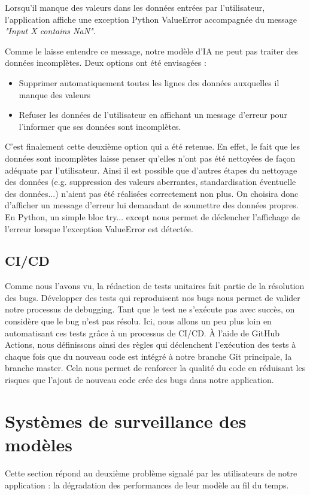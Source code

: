 \documentclass[french]{article}
\begin{document}
    Lorsqu'il manque des valeurs dans les données entrées par l'utilisateur, l'application affiche une exception Python ValueError accompagnée du message \textit{"Input X contains NaN"}.

    Comme le laisse entendre ce message, notre modèle d'IA ne peut pas traiter des données incomplètes. Deux options ont été envisagées :
    \begin{itemize}
        \item Supprimer automatiquement toutes les lignes des données auxquelles il manque des valeurs
        \item Refuser les données de l'utilisateur en affichant un message d'erreur pour l'informer que ses données sont incomplètes.
    \end{itemize}
    C'est finalement cette deuxième option qui a été retenue. En effet, le fait que les données sont incomplètes laisse penser qu'elles n'ont pas été nettoyées de façon adéquate par l'utilisateur. Ainsi il est possible que d'autres étapes du nettoyage des données (e.g. suppression des valeurs aberrantes, standardisation éventuelle des données...) n'aient pas été réalisées correctement non plus. On choisira donc d'afficher un message d'erreur lui demandant de soumettre des données propres. En Python, un simple bloc try... except nous permet de déclencher l'affichage de l'erreur lorsque l'exception ValueError est détectée.
    \subsection{CI/CD}
    Comme nous l'avons vu, la rédaction de tests unitaires fait partie de la résolution des bugs. Développer des tests qui reproduisent nos bugs nous permet de valider notre processus de debugging. Tant que le test ne s'exécute pas avec succès, on considère que le bug n'est pas résolu. Ici, nous allons un peu plus loin en automatisant ces tests grâce à un processus de CI/CD. À l'aide de GitHub Actions, nous définissons ainsi des règles qui déclenchent l'exécution des tests à chaque fois que du nouveau code est intégré à notre branche Git principale, la branche master. Cela nous permet de renforcer la qualité du code en réduisant les risques que l'ajout de nouveau code crée des bugs dans notre application.



    \section{Systèmes de surveillance des modèles}
    Cette section répond au deuxième problème signalé par les utilisateurs de notre application : la dégradation des performances de leur modèle au fil du temps.
\end{document}
